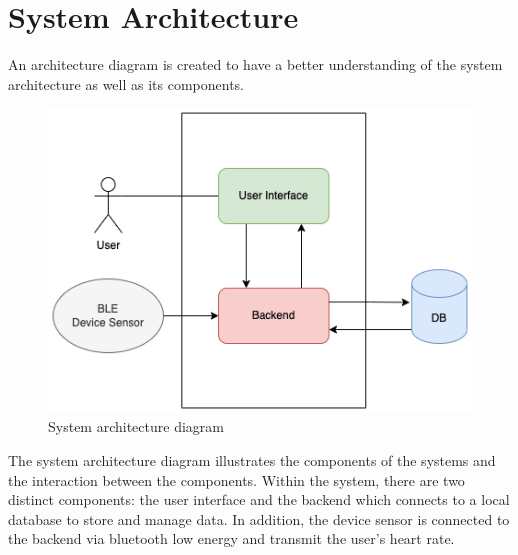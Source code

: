 \section{System Architecture}
An architecture diagram is created to have a better understanding of the system architecture as well as its components.
\begin{figure}[H]
    \centering
    \includegraphics[width=1\textwidth]{diagrams/system-diagram.drawio.png}
    \caption{System architecture diagram}
    \label{fig:sys_diagram}
\end{figure}
The system architecture diagram illustrates the components of the systems and the interaction between the components. Within the system, there are two distinct components: the user interface and the backend which connects to a local database to store and manage data.
In addition, the device sensor is connected to the backend via bluetooth low energy and transmit the user's heart rate.